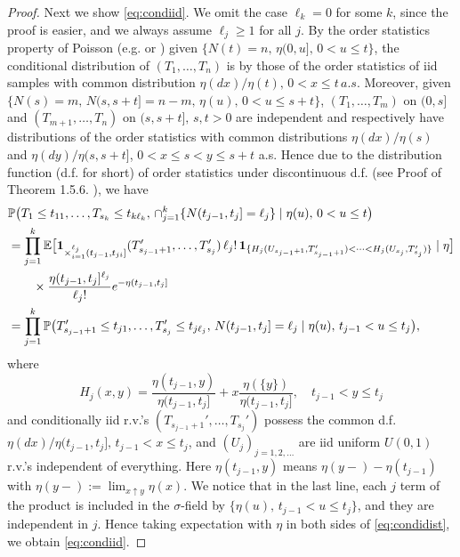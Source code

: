 \documentclass[11pt,leqno%
]{amsart}
\newcommand{\E }{{\mathbb E}}
\renewcommand{\P }{{\mathbb P}}
\newcommand{\1}{{\mathbf 1}}
\begin{document}
\begin{proof}
 Next we show \eqref{eq:condiid}. 
We omit the case $\ell_k=0$ for some $k$,
 since the proof is easier, and we always assume $\ell_j\ge 1$ for all $j$. 
By the order statistics property of Poisson
 (e.g. \cite[Theorem 6.6]{grandell:1997} or \cite[Corollary 9.2]{kallenberg:1983}) given
 $\{N(t)=n,\,\eta(0,u],\,0<u\le t\}$, the conditional distribution
 of $(T_1,\ldots,T_n)$ is by those of the order statistics of iid
 samples with common distribution $\eta(d x)/\eta(t),\,0<x\le t\,a.s.$
 Moreover, given $\{N(s)=m,\,N(s,s+t]=n-m,\,\eta(u),\,0<u\le s+t\}$, $(T_1,\ldots,T_m)$ on $(0,s]$ and $(T_{m+1},\ldots,T_n)$ on
 $(s,s+t],\,s,t>0$ are independent and respectively have distributions
 of the order statistics with common distributions $\eta(dx)/\eta(s)$ and
 $\eta(dy)/\eta(s,s+t]$, $0<x \le s <y \le s+t$ a.s. Hence due to the
 distribution function (d.f. for short) of order
 statistics under discontinuous d.f. (see Proof of Theorem
 1.5.6. \cite{reiss:1989}), we have 
 \begin{align}
\label{eq:condidist}
  & \P\big(
 T_1 \le t_{11},\ldots,T_{s_k} \le
  t_{k\ell_k},\,\cap_{j=1}^k \{ N(t_{j-1},t_j]=\ell_j \} \mid
  \eta(u),\,0<u\le t
 \big) \\
 & = \prod_{j=1}^k \E \big[
 {\bf
  1}_{\times_{i=1}^{\ell_j}(t_{j-1},t_{ji}]}(T_{s_{j-1}+1}',\ldots,T_{s_j}')\,\ell_j
  !\,
  {\bf
  1}_{\{H_j(U_{s_{j-1}+1},T_{s_{j-1}+1}')<\cdots<
  H_j(U_{s_j},T_{s_j}')\}}\mid \eta \big] \nonumber \\
 &\qquad \times \frac{\eta(t_{j-1},t_j]^{\ell_j}}{\ell_j!}
  e^{-\eta(t_{j-1},t_j]} \nonumber \\
 &=\prod_{j=1}^k \P\big(
 T_{s_{j-1}+1}'\le t_{j1},%
 \ldots,T_{s_{j}}'\le t_{j\ell_j},\,N(t_{j-1},t_j]=\ell_j \mid
  \eta(u),\,t_{j-1}<u \le t_j 
 \big),\nonumber
 \end{align}
where 
\[
 H_j(x,y)= \frac{\eta(t_{j-1},y)}{\eta(t_{j-1},t_j]}+x
 \frac{\eta(\{y\})}{\eta(t_{j-1},t_j]},\quad t_{j-1}<y \le t_j 
\]
and conditionally iid r.v.'s $(T_{s_{j-1}+1}',\ldots,T_{s_j}')$ possess the common
 d.f. $\eta(dx)/\eta(t_{j-1},t_j],\,t_{j-1}<x\le t_j$, and
 $(U_j)_{j=1,2,\ldots}$ are iid uniform $U(0,1)$ r.v.'s
 independent of everything. Here $\eta(t_{j-1},y)$ means
 $\eta(y-)-\eta(t_{j-1})$ with $\eta(y-):=\lim_{x \uparrow y}\eta(x)$. 
 We notice
 that in the last line, each $j$ term of the product is included
 in the $\sigma$-field by $\{\eta(u),\,t_{j-1}<u\le t_j\}$,
 and they are %
 independent in $j$. Hence taking expectation with $\eta$ in both sides
 of \eqref{eq:condidist}, we
 obtain \eqref{eq:condiid}. %


\end{proof}
\end{document}
